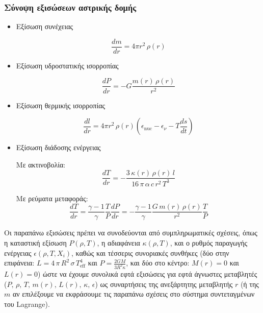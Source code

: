 \subsubsection{Σύνοψη εξισώσεων αστρικής δομής}
\begin{itemize}
    \item Εξίσωση συνέχειας
    
    \begin{equation*}
        \frac{dm}{dr} = 4\pi r^2 \, \rho(r)
    \end{equation*}
    
    \item Εξίσωση υδροστατικής ισορροπίας
    
    \begin{equation*}
        \frac{dP}{dr} = - G \frac{m(r) \,\rho(r)}{r^2}
    \end{equation*}
    
    \item Εξίσωση θερμικής ισορροπίας
    
    \begin{equation*}
        \frac{dl}{dr} = 4\pi r^2 \,\rho(r) \left(\epsilon_{\text{nuc}} - \epsilon_\nu - T \frac{ds}{dt} \right)
    \end{equation*}
    
    \item Εξίσωση διάδοσης ενέργειας
    
    Με ακτινοβολία:
    \begin{equation*}
        \frac{dT}{dr} = - \frac{3 \,\kappa(r) \,\rho(r) \,l}{16 \,\pi \,\alpha \,c \,r^2 \,T^3}
    \end{equation*}
    
    Με ρεύματα μεταφοράς:
    \begin{equation*}
        \frac{dT}{dr} = \frac{\gamma - 1}{\gamma} \frac{T}{P} \frac{dP}{dr} = - \frac{\gamma - 1}{\gamma} \frac{G \,m(r) \,\rho(r)}{r^2} \frac{T}{P}
    \end{equation*}
\end{itemize}

Οι παραπάνω εξισώσεις πρέπει να συνοδεύονται από συμπληρωματικές σχέσεις, όπως η καταστική εξίσωση $P(\rho, T)$, η αδιαφάνεια $\kappa(\rho, T)$, και ο ρυθμός παραγωγής ενέργειας $\epsilon(\rho, T, X_i)$, καθώς και τέσσερις συνοριακές συνθήκες (δύο στην επιφάνεια: $L = 4\,\pi \,R^2 \,\sigma \,T_{\text{eff}}^4$ και $P=\frac{2GM}{3 R^2 \kappa}$, και δύο στο κέντρο: $M(r) = 0$ και $L(r) = 0$) ώστε να έχουμε συνολικά εφτά εξισώσεις για εφτά άγνωστες μεταβλητές ($P, \,\rho, \,T, \,m(r), \,L(r), \,\kappa, \,\epsilon$) ως συναρτήσεις της ανεξάρτητης μεταβλητής $r$ (ή της $m$ αν επιλέξουμε να εκφράσουμε τις παραπάνω σχέσεις στο σύστημα συντεταγμένων του Lagrange).
